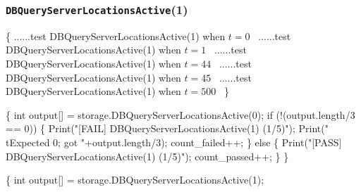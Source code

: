 \documentclass{article}
\def\nwendcode{\endtrivlist \endgroup}
\let\nwdocspar=\par
\begin{document}
\subsubsection{{\tt{}DBQueryServerLocationsActive}(1)}
\nwenddocs{}\endmoddef{}
\{
  \LA{}......test \code{}DBQueryServerLocationsActive\edoc{}(1) when $t=0$~{\nwtagstyle{}}\RA{}
  \LA{}......test \code{}DBQueryServerLocationsActive\edoc{}(1) when $t=1$~{\nwtagstyle{}}\RA{}
  \LA{}......test \code{}DBQueryServerLocationsActive\edoc{}(1) when $t=44$~{\nwtagstyle{}}\RA{}
  \LA{}......test \code{}DBQueryServerLocationsActive\edoc{}(1) when $t=45$~{\nwtagstyle{}}\RA{}
  \LA{}......test \code{}DBQueryServerLocationsActive\edoc{}(1) when $t=500$~{\nwtagstyle{}}\RA{}
\}
\nwendcode{}\nwdocspar
\nwenddocs{}\endmoddef{}
\{
  int output[] = storage.DBQueryServerLocationsActive(0);
  if (!(output.length/3 == 0)) \{
    Print("[FAIL] DBQueryServerLocationsActive(1) (1/5)");
    Print("\\tExpected 0; got "+output.length/3);
    count_failed++;
  \} else \{
    Print("[PASS] DBQueryServerLocationsActive(1) (1/5)");
    count_passed++;
  \}
\}
\nwendcode{}\nwdocspar
\nwenddocs{}\endmoddef{}
\{
  int output[] = storage.DBQueryServerLocationsActive(1);
\end{document}
